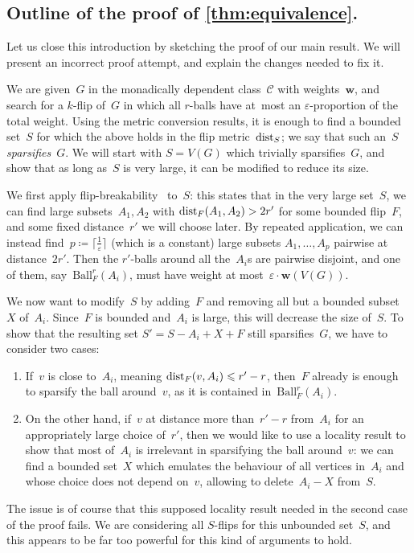 \documentclass[a4paper,UKenglish,cleveref, autoref, thm-restate]{lipics-v2021}
\newcommand{\eps}{\varepsilon}
\newcommand{\dist}{\textnormal{dist}}
\newcommand{\ceil}[1]{\lceil #1 \rceil}
\newcommand{\weight}{\mathbf{w}}
\newcommand{\CC}{\mathcal{C}}
\newcommand{\Cc}{\CC}
\renewcommand{\le}{\leqslant}
\newcommand{\Ball}{\mathrm{Ball}}
\begin{document}
\subsection*{Outline of the proof of \cref{thm:equivalence}.}
Let us close this introduction by sketching the proof of our main result.
We will present an incorrect proof attempt, and explain the changes needed to fix it.

We are given~$G$ in the monadically dependent class~$\Cc$ with weights~$\weight$, and search for a $k$-flip of~$G$ in which all $r$-balls have at~most an $\eps$-proportion of the total weight.
Using the metric conversion results, it is enough to find a bounded set~$S$ for which the above holds in the flip metric~$\dist_S$; we say that such an~$S$ \emph{sparsifies}~$G$.
We will start with $S = V(G)$ which trivially sparsifies~$G$, and show that as long as~$S$ is very large, it can be modified to reduce its size.

We first apply flip-breakability~\cite{flip-breakability} to~$S$:
this states that in the very large set~$S$, we can find large subsets~$A_1,A_2$ with $\dist_F(A_1,A_2) > 2r'$ for some bounded flip~$F$, and some fixed distance~$r'$ we will choose later.
By repeated application, we can instead find~$p \coloneqq \ceil{\frac{1}{\eps}}$ (which is a constant) large subsets $A_1,\dots,A_p$ pairwise at distance~$2r'$.
Then the $r'$-balls around all the~$A_i$s are pairwise disjoint, and one of them, say~$\Ball_F^r(A_i)$, must have weight at most~$\eps \cdot \weight(V(G))$.

We now want to modify~$S$ by adding~$F$ and removing all but a bounded subset~$X$ of~$A_i$.
Since~$F$ is bounded and~$A_i$ is large, this will decrease the size of~$S$.
To show that the resulting set $S' = S - A_i + X + F$ still sparsifies~$G$, we have to consider two cases:
\begin{enumerate}
  \item If~$v$ is close to~$A_i$, meaning $\dist_F(v,A_i) \le r'-r$, then~$F$ already is enough to sparsify the ball around~$v$, as it is contained in~$\Ball_F^r(A_i)$.
  \item On the other hand, if~$v$ at distance more than~$r'-r$ from~$A_i$ for an appropriately large choice of~$r'$,
    then we would like to use a locality result to show that most of~$A_i$ is irrelevant in sparsifying the ball around~$v$:
    we can find a bounded set~$X$ which emulates the behaviour of all vertices in~$A_i$ and whose choice does not depend on~$v$, allowing to delete~$A_i-X$ from~$S$.
\end{enumerate}
The issue is of course that this supposed locality result needed in the second case of the proof fails.
We are considering all $S$-flips for this unbounded set~$S$, and this appears to be far too powerful for this kind of arguments to hold.
\end{document}
